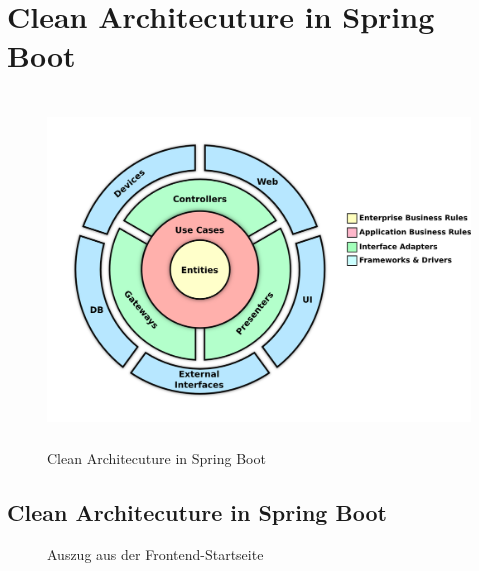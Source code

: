 %	
%

\section{Clean Architecuture in Spring Boot} \label{a.2.cleanArchitecture}
\begin{figure}[h]
	\centering
	\includegraphics[height=350px]{./zfiles/Bilder/cleanArchitecture.png}
	\caption{Clean Architecuture in Spring Boot \cite{cleanArchitecture.medium}}
	\label{a.2.cleanArchitecture}
\end{figure}

\begin{landscape}
	\vspace*{1cm}
	\section{Clean Architecuture in Spring Boot} \label{a.2.frontend}
	\begin{figure}[h]
		\centering
		\caption{Auszug aus der Frontend-Startseite}
		\label{2.frontend}
	\end{figure}
\end{landscape}


\newpage
